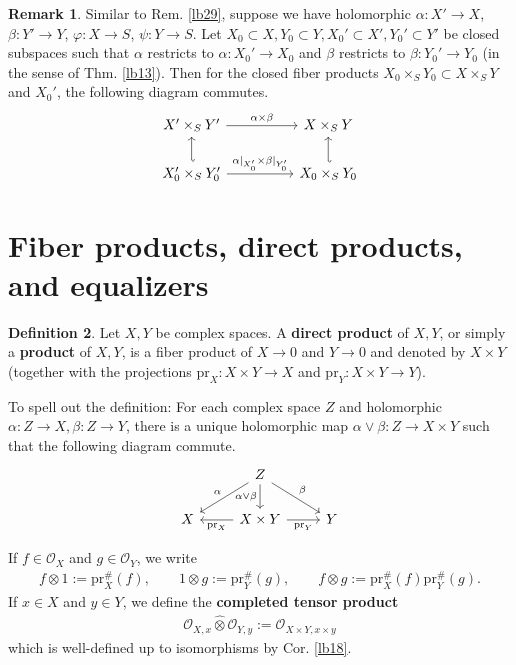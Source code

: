 \documentclass[12pt,b5paper,notitlepage]{report}
\theoremstyle{definition}
\newtheorem{df}{Definition}[section]
\newtheorem{rem}[df]{Remark}
\theoremstyle{plain}
\newcommand{\wht}{\widehat}
\newcommand{\scr}{\mathscr}
\newcommand{\pr}{\mathrm {pr}}
\numberwithin{equation}{section}
\begin{document}
\begin{rem}
Similar to Rem. \ref{lb29}, suppose we have holomorphic $\alpha:X'\rightarrow X$, $\beta:Y'\rightarrow Y$, $\varphi:X\rightarrow S$, $\psi:Y\rightarrow S$. Let $X_0\subset X,Y_0\subset Y,X_0'\subset X',Y_0'\subset Y'$ be closed subspaces such that $\alpha$ restricts to $\alpha:X_0'\rightarrow X_0$ and $\beta$ restricts to $\beta:Y_0'\rightarrow Y_0$ (in the sense of Thm. \ref{lb13}). Then for the closed fiber products $X_0\times_S Y_0\subset X\times_SY$ and $X_0'$, the following diagram commutes.
\begin{equation}
\begin{tikzcd}
X'\times_SY' \arrow[rr, "\alpha\times\beta"]                            &  & X\times_SY                 \\
X_0'\times_SY_0' \arrow[rr, "\alpha|_{X_0'}\times\beta|_{Y_0'}"] \arrow[u, hook']& & X_0\times_S Y_0 \arrow[u, hook']
\end{tikzcd}
\end{equation}
\end{rem}




\section{Fiber products, direct products, and equalizers}

\begin{df}
Let $X,Y$ be complex spaces. A \textbf{direct product} of $X,Y$, or simply a \textbf{product} of $X,Y$, is a fiber product of $X\rightarrow 0$ and $Y\rightarrow 0$ and denoted by $X\times Y$ (together with the projections $\pr_X:X\times Y\rightarrow X$ and $\pr_Y:X\times Y\rightarrow Y$).

To spell out the definition: For each complex space $Z$ and holomorphic $\alpha:Z\rightarrow X,\beta:Z\rightarrow Y$, there is a unique holomorphic map $\alpha\vee\beta:Z\rightarrow X\times Y$ such that the following diagram commute.
\begin{equation*}
\begin{tikzcd}
  & Z \arrow[ld, "\alpha"'] \arrow[rd, "\beta"] \arrow[d,"\alpha\vee\beta"'] &   \\
X & X\times Y \arrow[l, "\pr_X"] \arrow[r, "\pr_Y"']              & Y
\end{tikzcd}
\end{equation*}

If $f\in\scr O_X$ and $g\in\scr O_Y$, we write \index{fg@$f\otimes g\in\scr O_{X\times Y}$}
\begin{align}
f\otimes 1:=\pr_X^\#(f),\qquad 1\otimes g:=\pr_Y^\#(g),\qquad f\otimes g:=\pr_X^\#(f)\pr_Y^\#(g).\label{eq78}
\end{align}
If $x\in X$ and $y\in Y$, we define the \textbf{completed tensor product}
\begin{align*}
\scr O_{X,x}\wht\otimes\scr O_{Y,y}:=\scr O_{X\times Y,x\times y}
\end{align*}
which is well-defined up to isomorphisms by Cor. \ref{lb18}.\hfill\qedsymbol
\end{df}
\end{document}
